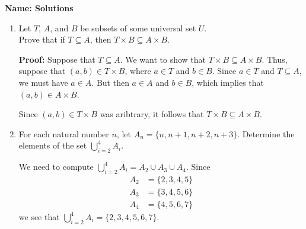\documentclass[12pt]{article}
\newcommand{\points}[1]{\marginpar{\hspace{24pt}[#1]}}
\begin{document}
{\bf Name: Solutions}
\thispagestyle{fancy}

\bigskip

\begin{enumerate}
 \item Let $T$, $A$, and $B$ be subsets of some universal set $U$. \\
 Prove that if $T\subseteq A$, then $T\times B\subseteq A\times B$. \points{5}

\bigskip

{\bf Proof: } Suppose that $T\subseteq A$. We want to show that $T\times B\subseteq A\times B$. Thus, suppose that $(a,b)\in T\times B$, where $a\in T$ and $b\in B$. Since $a\in T$ and $T\subseteq A$, we must have $a\in A$. But then $a\in A$ and $b\in B$, which implies that $(a,b)\in A\times B$.

Since $(a,b)\in T\times B$ was aribtrary, it follows that $T\times B\subseteq A\times B$.

\bigskip


 \item For each natural number $n$, let $A_n=\{n,n+1,n+2,n+3\}$. Determine the elements of the set $\displaystyle\bigcup_{i=2}^4 A_i$. \points{5}


\bigskip

We need to compute $\displaystyle\bigcup_{i=2}^4 A_i = A_2\cup A_3\cup A_4$. Since
\begin{align*}
 A_2 & = \{2,3,4,5\}\\
 A_3 & = \{3,4,5,6\}\\
 A_4 & = \{4,5,6,7\}
\end{align*}
we see that $\displaystyle\bigcup_{i=2}^4 A_i = \{2,3,4,5,6,7\}$.
\end{enumerate}
\end{document}
